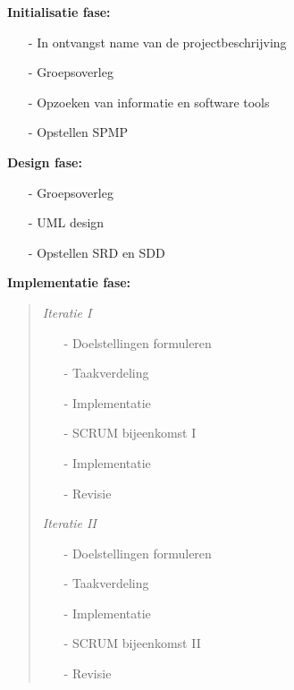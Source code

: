 \documentclass{article}
\begin{document}
\textbf{Initialisatie fase:}
\begin{itemize}
\item[-] In ontvangst name van de projectbeschrijving\\[-5mm]
\item[-] Groepsoverleg\\[-5mm]
\item[-] Opzoeken van informatie en software tools\\[-5mm]
\item[-] Opstellen SPMP\\[-5mm]
\end{itemize}


\textbf{Design fase:}
\begin{itemize}
\item[-]Groepsoverleg\\[-5mm]
\item[-]UML design\\[-5mm]
\item[-]Opstellen SRD en SDD\\[-5mm]
\end{itemize}

\textbf{Implementatie fase:}
\begin{quotation}
	

\textit{Iteratie I}
\begin{itemize}
\item[-] Doelstellingen formuleren\\[-5mm]
\item[-] Taakverdeling\\[-5mm]
\item[-] Implementatie\\[-5mm]
\item[-] SCRUM bijeenkomst I\\[-5mm]
\item[-] Implementatie\\[-5mm]
\item[-] Revisie\\[-5mm]
\end{itemize}

\textit{Iteratie II}
\begin{itemize}
\item[-] Doelstellingen formuleren\\[-5mm]
\item[-] Taakverdeling\\[-5mm]
\item[-] Implementatie\\[-5mm]
\item[-] SCRUM bijeenkomst II\\[-5mm]
\item[-] Revisie\\[-5mm]
\end{itemize}

\end{quotation}
\end{document}
